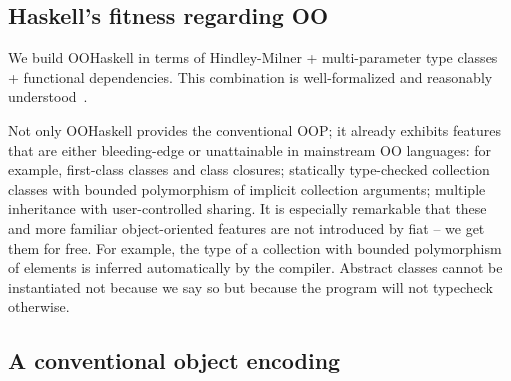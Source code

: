 


\subsection{Haskell's fitness regarding OO}

We build OOHaskell in terms of Hindley-Milner + multi-parameter type
classes + functional dependencies. This combination is well-formalized
and reasonably understood~\cite{SS04}.

Not only OOHaskell provides the conventional OOP; it already exhibits
features that are either bleeding-edge or unattainable in mainstream
OO languages: for example, first-class classes and class closures;
statically type-checked collection classes with bounded polymorphism
of implicit collection arguments; multiple inheritance with
user-controlled sharing. It is especially remarkable that these and
more familiar object-oriented features are not introduced by fiat --
we get them for free. For example, the type of a collection with
bounded polymorphism of elements is inferred automatically by the
compiler. Abstract classes cannot be instantiated not because we say
so but because the program will not typecheck otherwise.


\begin{comment}
At the heart of our approach is the powerful deployment of Haskell's
type classes. It will turn out that we can provide object classes
because of Haskell's type classes. In fact,  Once we have extensible
records with reusable labels and subtyping, we can model some sort of
objects. The corresponding record types, suitably parameterised, are
OOP-like classes then. Mutable objects can be modelled by using
references such as the @IORef@s provided by Haskell's @IO@ monad.
\end{comment}






\subsection{A conventional object encoding}

